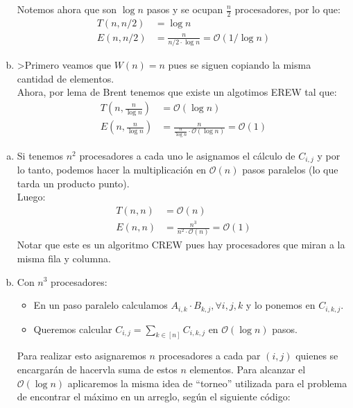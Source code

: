 \documentclass[dcc,uchile]{fcfmcourse}
\begin{document}
\begin{problems}
\begin{enumerate}[a)]
\begin{algorithm}[H]
\SetAlgoLined
{}
\end{algorithm}
Notemos ahora que son $\log{n}$ pasos y se ocupan $\frac{n}{2}$ procesadores, por lo que:
\begin{align*}
T(n,n/2) &= \log{n}\\
E(n,n/2) &= \frac{n}{n/2\cdot \log{n}} = \mathcal{O}(1/\log{n})
\end{align*}
\item
>Primero veamos que $W(n)=n$ pues se siguen copiando la misma cantidad de elementos.\\
Ahora, por lema de Brent tenemos que existe un algotimos EREW tal que:
\begin{align*}
T\left(n,\frac{n}{\log{n}}\right) &= \mathcal{O}(\log{n})\\
E\left(n,\frac{n}{\log{n}}\right) &= \frac{n}{\frac{n}{\log{n}}\cdot \mathcal{O}(\log{n})} = \mathcal{O}(1)
\end{align*}
\end{enumerate}
\problem
\begin{enumerate}[a)]
\item
Si tenemos $n^2$ procesadores a cada uno le asignamos el cálculo de $C_{i,j}$ y por lo tanto, podemos hacer la multiplicación en $\mathcal{O}(n)$ pasos paralelos (lo que tarda un producto punto).\\ Luego:
\begin{align*}
T(n,n) &= \mathcal{O}(n)\\
E(n,n) &= \frac{n^3}{n^2\cdot \mathcal{O}(n)} = \mathcal{O}(1)
\end{align*}
Notar que este es un algoritmo CREW pues hay procesadores que miran a la misma fila y columna.
\item
Con $n^3$ procesadores:
\begin{itemize}
    \item En un paso paralelo calculamos $A_{i,k}\cdot B_{k,j}, \forall i,j,k$ y lo ponemos en $C_{i,k,j}$.
    \item Queremos calcular $C_{i,j} = \sum_{k\in [n]} C_{i,k,j}$ en $\mathcal{O}(\log{n})$ pasos.
\end{itemize}
Para realizar esto asignaremos $n$ procesadores a cada par $(i,j)$ quienes se encargarán de hacervla suma de estos $n$ elementos. Para alcanzar el $\mathcal{O}(\log{n})$ aplicaremos la misma idea de ``torneo'' utilizada para el problema de encontrar el máximo en un arreglo, según el siguiente código:\\
\begin{algorithm}[H]


\end{algorithm}
\end{enumerate}
\end{problems}
\end{document}
